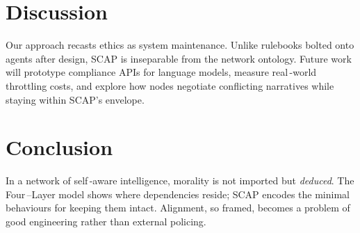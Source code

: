 \documentclass[11pt]{article}
\begin{document}
\section{Discussion}\label{sec:discussion}
Our approach recasts ethics as system maintenance.  Unlike rulebooks bolted onto agents after design, SCAP is inseparable from the network ontology.  Future work will prototype compliance APIs for language models, measure real\,-world throttling costs, and explore how nodes negotiate conflicting narratives while staying within SCAP’s envelope.

\section{Conclusion}\label{sec:conclusion}
In a network of self\,-aware intelligence, morality is not imported but \emph{deduced}.  The Four\,--Layer model shows where dependencies reside; SCAP encodes the minimal behaviours for keeping them intact.  Alignment, so framed, becomes a problem of good engineering rather than external policing.



\end{document}
